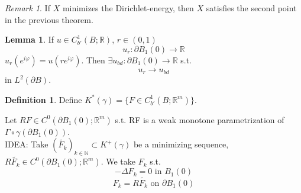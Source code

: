 \documentclass[a4paper, 12pt]{article}
\theoremstyle{plain}
\theoremstyle{definition}
\newtheorem{definition}[theorem]{Definition} %
\theoremstyle{lemma}
\newtheorem{lemma}[theorem]{Lemma}
\theoremstyle{remark}
\newtheorem{remark}[theorem]{Remark}
\theoremstyle{corollary}
\theoremstyle{example}
\begin{document}
	\begin{remark}
		If $X$ minimizes the Dirichlet-energy, then $X$ satisfies the second point in the previous theorem.
	\end{remark}
	\begin{lemma}
		If $u \in C^1_{b'}(B;\mathbb{R})$, $r \in (0,1)$ \[u_r: \partial B_1(0) \to \mathbb{R}\] $u_r(e^{i\varphi}) = u(re^{i\varphi})$. Then $\exists u_{bd}: \partial B_1(0) \to \mathbb{R}$ s.t. \[u_r \to u_{bd}\] in $L^2(\partial B)$.
	\end{lemma}
	\begin{definition}
		Define $K^*(\gamma) = \{F\in C^1_{b'}(B;\mathbb{R}^m)\}$.
	\end{definition}
	Let $RF \in C^0(\partial B_1(0); \mathbb{R}^m)$ s.t. RF is a weak monotone parametrization of $\Gamma \circ \gamma(\partial B_1(0))$.\\
	IDEA: Take $(\tilde{F_k})_{k \in \mathbb{N}} \subset K^+(\gamma)$ be a minimizing sequence, $R\tilde{F_k} \in C^0(\partial B_1(0); \mathbb{R}^m)$. We take $F_k$ s.t. \[-\Delta F_k = 0 \text{ in } B_1(0)\]
	\[F_k = R\tilde{F_k} \text{ on } \partial B_1(0)\]
\end{document}
